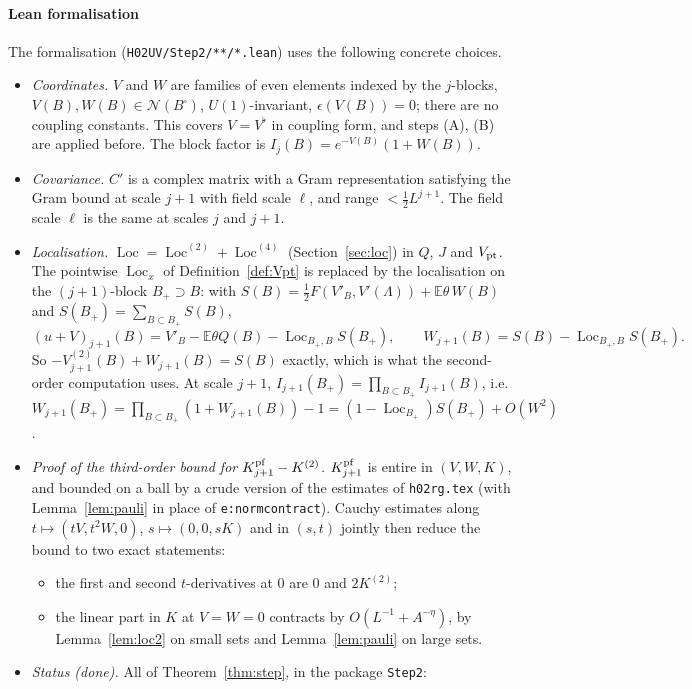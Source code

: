 \documentclass[11pt]{amsart}
\theoremstyle{definition}
\theoremstyle{remark}
\numberwithin{equation}{section}
\newcommand{\E}{\mathbb{E}}
\newcommand{\cN}{\mathcal{N}}
\newcommand{\Loc}{\operatorname{Loc}}
\newcommand{\hr}{\texttt{h02rg.tex}}
\begin{document}
\paragraph{Lean formalisation}
The formalisation (\texttt{H02UV/Step2/**/*.lean}) uses the following concrete choices.
\begin{itemize}
\item \emph{Coordinates.} $V$ and $W$ are families of even elements indexed by the $j$-blocks,
  $V(B),W(B)\in\cN(B^\square)$, $U(1)$-invariant, $\epsilon(V(B))=0$; there are no coupling
  constants. This covers $V=V^\flat$ in coupling form, and steps (A), (B) are applied before.
  The block factor is $I_j(B)=e^{-V(B)}(1+W(B))$.
\item \emph{Covariance.} $C'$ is a complex matrix with a Gram representation satisfying the
  Gram bound at scale $j+1$ with field scale $\ell$, and range $<\frac12L^{j+1}$. The field
  scale $\ell$ is the same at scales $j$ and $j+1$.
\item \emph{Localisation.} $\Loc=\Loc^{(2)}+\Loc^{(4)}$ (Section~\ref{sec:loc}) in $Q$, $J$ and
  $V_{\rm pt}$. The pointwise $\Loc_x$ of Definition~\ref{def:Vpt} is replaced by the
  localisation on the $(j+1)$-block $B_+\supset B$: with
  $S(B)=\frac12F(V'_B,V'(\Lambda))+\E\theta\,W(B)$ and $S(B_+)=\sum_{B\subset B_+}S(B)$,
  \[
    (u+V)_{j+1}(B)=V'_B-\E\theta Q(B)-\Loc_{B_+,B}S(B_+),\qquad
    W_{j+1}(B)=S(B)-\Loc_{B_+,B}S(B_+).
  \]
  So $-V^{(2)}_{j+1}(B)+W_{j+1}(B)=S(B)$ exactly, which is what the second-order computation
  uses. At scale $j+1$, $I_{j+1}(B_+)=\prod_{B\subset B_+}I_{j+1}(B)$, i.e.
  $W_{j+1}(B_+)=\prod_{B\subset B_+}(1+W_{j+1}(B))-1=(1-\Loc_{B_+})S(B_+)+O(W^2)$.
\item \emph{Proof of the third-order bound for $K^{\rm pf}_{j+1}-K^{(2)}$.} $K^{\rm pf}_{j+1}$ is entire in $(V,W,K)$, and bounded on a
  ball by a crude version of the estimates of \hr{} (with Lemma~\ref{lem:pauli} in place of
  \texttt{e:normcontract}). Cauchy estimates along $t\mapsto(tV,t^2W,0)$, $s\mapsto(0,0,sK)$
  and in $(s,t)$ jointly then reduce the bound to two exact statements:
  \begin{itemize}
  \item the first and second $t$-derivatives at $0$ are $0$ and $2K^{(2)}$;
  \item the linear part in $K$ at $V=W=0$ contracts by $O(L^{-1}+A^{-\eta})$, by
    Lemma~\ref{lem:loc2} on small sets and Lemma~\ref{lem:pauli} on large sets.
  \end{itemize}
\item \emph{Status (done).} All of Theorem~\ref{thm:step}, in the package \texttt{Step2}:

\end{itemize}
\end{document}
